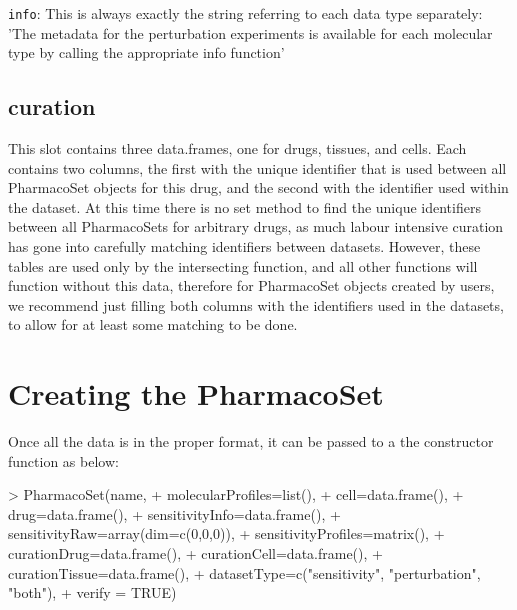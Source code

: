 \documentclass[11pt]{article}
\begin{document}
\texttt{info}: This is always exactly the string referring to each data type separately: 'The metadata for the perturbation experiments is available for each molecular type by calling the appropriate info function'


\subsection{curation}

This slot contains three data.frames, one for drugs, tissues, and cells. Each contains two columns, the first with the unique identifier that is used between all PharmacoSet objects for this drug, and the second with the identifier used within the dataset. At this time there is no set method to find the unique identifiers between all PharmacoSets for arbitrary drugs, as much labour intensive curation has gone into carefully matching identifiers between datasets. However, these tables are used only by the intersecting function, and all other functions will function without this data, therefore for PharmacoSet objects created by users, we recommend just filling both columns with the identifiers used in the datasets, to allow for at least some matching to be done. 

\section{Creating the PharmacoSet}


Once all the data is in the proper format, it can be passed to a the constructor function as below:
\begin{Schunk}
\begin{Sinput}
> PharmacoSet(name, 
+             molecularProfiles=list(), 
+             cell=data.frame(), 
+             drug=data.frame(), 
+             sensitivityInfo=data.frame(),
+             sensitivityRaw=array(dim=c(0,0,0)), 
+             sensitivityProfiles=matrix(), 
+             curationDrug=data.frame(), 
+             curationCell=data.frame(), 
+             curationTissue=data.frame(), 
+             datasetType=c("sensitivity", "perturbation", "both"),
+             verify = TRUE)
\end{Sinput}
\end{Schunk}
\end{document}
